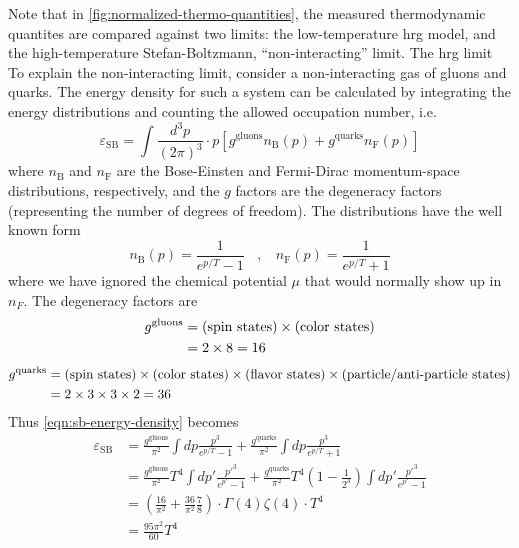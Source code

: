 Note that in \ref{fig:normalized-thermo-quantities}, the measured thermodynamic quantites are compared against two limits: the low-temperature \gls{hrg} model, and the high-temperature Stefan-Boltzmann, ``non-interacting'' limit.
The \gls{hrg} limit
To explain the non-interacting limit, consider a non-interacting gas of gluons and quarks.
The energy density for such a system can be calculated by integrating the energy distributions and counting the allowed occupation number, i.e.
\begin{equation}
  \label{eqn:sb-energy-density}
  \varepsilon_{\text{SB}} = \int \frac{d^3p}{(2\pi)^3} \cdot p \left[ g^{\text{gluons}} n_{\text{B}}(p) + g^{\text{quarks}} n_{\text{F}}(p)  \right]
\end{equation}
where $n_{\text{B}}$ and $n_{\text{F}}$ are the Bose-Einsten and Fermi-Dirac momentum-space distributions, respectively, and the $g$ factors are the degeneracy factors (representing the number of degrees of freedom).
The distributions have the well known form
\begin{equation}
  n_{\text{B}}(p) = \frac{1}{e^{p/T} - 1} \ \ \ \ , \ \ \ \ n_{\text{F}}(p) = \frac{1}{e^{p/T} + 1}
\end{equation}
where we have ignored the chemical potential $\mu$ that would normally show up in $n_F$.
The degeneracy factors are
\begin{align}
  g^{\text{gluons}} &= \text{(spin states)} \times \text{(color states)} \\
  &= 2 \times 8 = 16 \notag
\end{align}
\begin{align}
  g^{\text{quarks}} &= \text{(spin states)} \times \text{(color states)} \times \text{(flavor states)} \times \text{(particle/anti-particle states)}\\
  &= 2 \times 3 \times 3 \times 2= 36 \notag
\end{align}
Thus \ref{eqn:sb-energy-density} becomes
\begin{align}
  \varepsilon_{\text{SB}} &= \frac{g^{\text{gluons}}}{\pi^2} \int dp \frac{p^3}{e^{p/T} - 1} + \frac{g^{\text{quarks}}}{\pi^2}\int dp \frac{p^3}{e^{p/T} + 1} \\
  &= \frac{g^{\text{gluons}}}{\pi^2} T^4 \int dp' \frac{p'^3}{e^{p'} - 1} + \frac{g^{\text{quarks}}}{\pi^2} T^4 \left(1 - \frac{1}{2^3}\right) \int dp' \frac{p'^3}{e^{p'} - 1}    \\ 
  &= \left( \frac{16}{\pi^2} + \frac{36}{\pi^2}\frac{7}{8} \right) \cdot \Gamma(4) \zeta(4) \cdot T^4 \\
  &= \frac{95 \pi^2}{60} T^4 \label{eqn:sb-energy-density-final-simple}
\end{align}
